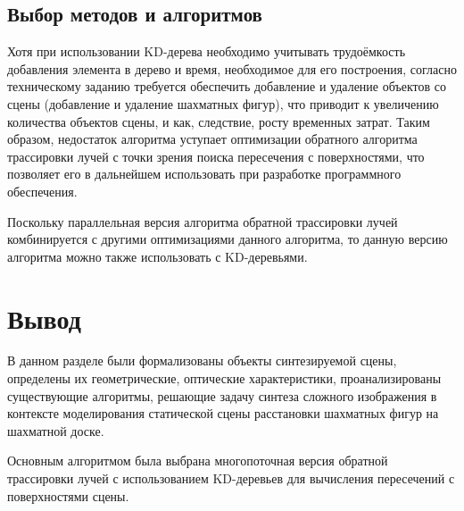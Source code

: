 \subsection{Выбор методов и алгоритмов}

Хотя при использовании KD-дерева необходимо учитывать трудоёмкость добавления элемента в дерево и время, необходимое для его построения, согласно техническому заданию требуется обеспечить добавление и удаление объектов со сцены (добавление и удаление шахматных фигур), что приводит к увеличению количества объектов сцены, и как, следствие, росту временных затрат. Таким образом, недостаток алгоритма уступает оптимизации обратного алгоритма трассировки лучей с точки зрения поиска пересечения с поверхностями, что позволяет его в дальнейшем использовать при разработке программного обеспечения.

Поскольку параллельная версия алгоритма обратной трассировки лучей комбинируется с другими оптимизациями данного алгоритма, то данную версию алгоритма можно также использовать с KD-деревьями.

\section*{Вывод}

В данном разделе были формализованы объекты синтезируемой сцены, определены их геометрические, оптические характеристики, проанализированы существующие алгоритмы, решающие задачу синтеза сложного изображения в контексте моделирования статической сцены расстановки шахматных фигур на шахматной доске.

Основным алгоритмом была выбрана многопоточная версия обратной трассировки лучей с использованием KD-деревьев для вычисления пересечений с поверхностями сцены.
























